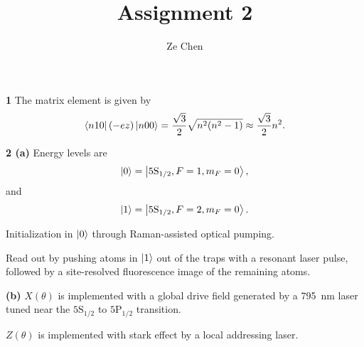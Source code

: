 \documentclass{article}
\title{Assignment 2}
\author{Ze Chen}
\makeatletter
\newcommand*{\shifttext}[1]{%
  \settowidth{\@tempdima}{#1}%
  \hspace{-\@tempdima}#1%
}
\newcommand{\plabel}[1]{%
\shifttext{\textbf{#1}\quad}%
}
\newcommand{\prule}{%
\begin{center}%
\hdashrule[0.5ex]{.99\linewidth}{1pt}{1pt 2.5pt}%
\end{center}%
}
\makeatother
\begin{document}
\maketitle

\plabel{1}%
The matrix element is given by
\[ \bra{n10} (-ez) \ket{n00} = \frac{\sqrt{3}}{2}\sqrt{n^2(n^2-1)} \approx \frac{\sqrt{3}}{2}n^2. \]
\begin{center}
\end{center}

\prule

\plabel{2 (a)}%
Energy levels are
\[ \ket{0} = \ket{5\mathrm{S}_{1/2},F=1,m_F=0}, \]
and
\[ \ket{1} = \ket{5\mathrm{S}_{1/2},F=2,m_F=0}. \]
\par
Initialization in $\ket{0}$ through Raman-assisted optical pumping.
\par
Read out by pushing atoms in $\ket{1}$ out of the traps with a resonant laser pulse, followed by a site-resolved fluorescence image of the remaining atoms.

\plabel{(b)}%
$X(\theta)$ is implemented with a global drive field generated by a \SI{795}{\nano\meter} laser tuned near the $5\mathrm{S}_{1/2}$ to $5\mathrm{P}_{1/2}$ transition.
\par
$Z(\theta)$ is implemented with stark effect by a local addressing laser.
\end{document}
